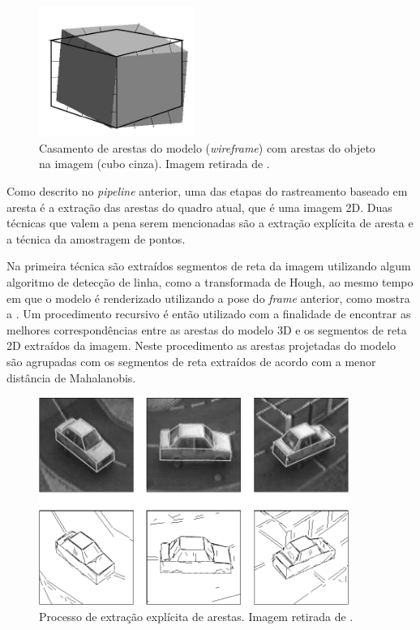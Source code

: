\begin{figure}[!ht]
\centering\includegraphics[width=2in]{monografia/cubo_pipeline_drummond}
\caption{Casamento de arestas do modelo (\emph{wireframe}) com arestas do objeto na imagem (cubo cinza). Imagem retirada de \cite{drummondecipolla}.}
\label{cubo_pipeline_drummond}
\end{figure}

Como descrito no \emph{pipeline} anterior, uma das etapas do rastreamento baseado em aresta é a extração das arestas do quadro atual, que é uma imagem 2D. Duas técnicas que valem a pena serem mencionadas são a extração explícita de aresta \cite{extracao_explicita} e a técnica da amostragem de pontos\cite{drummondecipolla}.

\label{sec:extracao_explicita}
Na primeira técnica são extraídos segmentos de reta da imagem utilizando algum algoritmo de detecção de linha, como a transformada de Hough, ao mesmo tempo em que o modelo é renderizado utilizando a pose do \emph{frame} anterior, como mostra a . Um procedimento recursivo é então utilizado com a finalidade de encontrar as melhores correspondências entre as arestas do modelo 3D e os segmentos de reta 2D extraídos da imagem. Neste procedimento as arestas projetadas do modelo são agrupadas com os segmentos de reta extraídos de acordo com a menor distância de Mahalanobis.

\begin{figure}[!t]
\centering\includegraphics[width=0.9\textwidth]{monografia/carro_extracao_explicita}
\caption{Processo de extração explícita de arestas. Imagem retirada de \cite{extracao_explicita}.}
\label{carro_extracao_explicita}
\end{figure}

